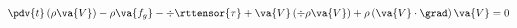 \begin{equation}
\pdv{t}\left(\rho\va{V}\right) 
  - \rho \va{f_g} 
  - \div\rttensor{\tau} 
  + \va{V}\left(\div{\rho\va{V}}\right) 
  + \rho\left(\va{V}\cdot\grad\right)\va{V} = 0
\end{equation}

